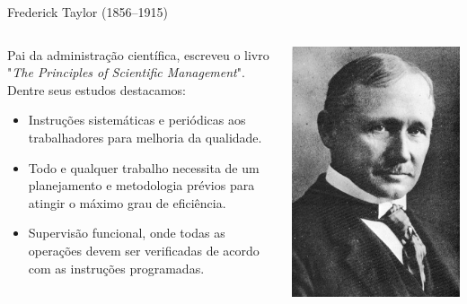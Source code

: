 \begin{frame}{Frederick Taylor (1856--1915)}
  
  \begin{columns}
    \begin{column}{.65\textwidth}
      Pai da administração científica, escreveu o livro "\emph{The Principles of Scientific Management}". Dentre seus estudos destacamos:
      \pause
      \begin{itemize}[<+->]
      \item  Instruções sistemáticas e periódicas aos trabalhadores para melhoria da qualidade.
      \item Todo e qualquer trabalho necessita de um planejamento e metodologia prévios para atingir o máximo grau de eficiência.
      \item Supervisão funcional, onde todas as operações devem ser verificadas de acordo com as instruções programadas.
      \end{itemize}
    \end{column}
    \begin{column}{.35\textwidth}
      \includegraphics[scale=.3]{img/frederick-taylor.png}
    \end{column}
  \end{columns}

\end{frame}

